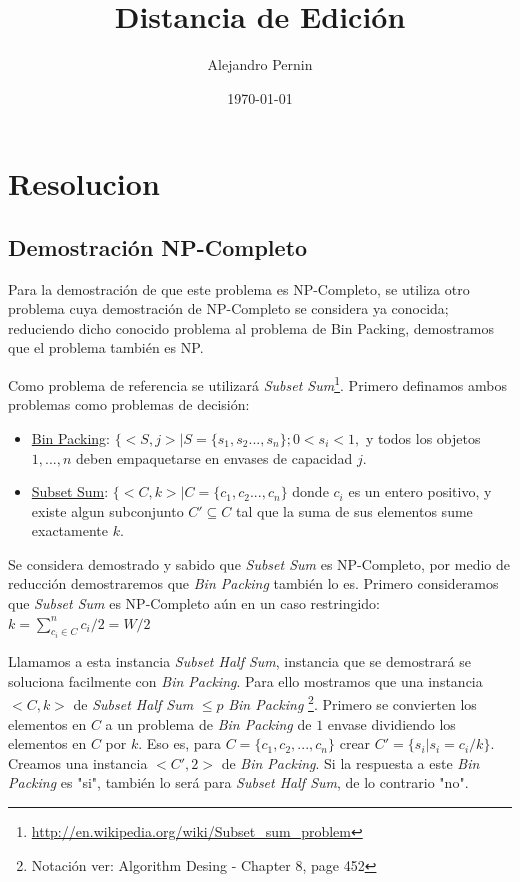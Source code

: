 \documentclass[12pt]{article}
\title{Distancia de Edición}
\author{
        Alejandro Pernin 
}
\date{\today}
\begin{document}


\maketitle

\newpage
\tableofcontents

\newpage



\newpage
\section{Resolucion}
	\subsection{Demostración NP-Completo}
		Para la demostración de que este problema es NP-Completo, se 
		utiliza otro problema cuya demostración de NP-Completo se considera
		ya conocida; reduciendo dicho conocido problema al problema de
		Bin Packing, demostramos que el problema también es NP.
		
		Como problema de referencia se utilizar\'a \emph{Subset Sum}\footnote{\url{http://en.wikipedia.org/wiki/Subset_sum_problem}}.
		Primero definamos ambos problemas como problemas de decisión:
		\begin{itemize}
			\item \underline{Bin Packing}: $\{ <S,j> | S = \{ s_{1},s_{2}...,s_{n}\}; 0<s_{i}<1,$ 
			y todos los objetos $1,...,n$ deben empaquetarse en envases de capacidad $j$.
			
			\item \underline{Subset Sum}: $\{ <C,k> | C = \{ c_{1},c_{2}...,c_{n}\}$ donde $c_{i}$
			es un entero positivo, y existe algun subconjunto $C'\subseteq C$ tal que la suma de sus
			elementos sume exactamente $k$.
		\end{itemize}
		
		Se considera demostrado y sabido que \emph{Subset Sum} es NP-Completo, 
		por medio de reducción demostraremos que \emph{Bin Packing} también lo es.
		Primero consideramos que \emph{Subset Sum} es NP-Completo aún en un caso restringido:
			\\ 
			
			$k=\sum_{c_{i}\in C}^{n} c_{i}/2 = W/2$
			
		Llamamos a esta instancia \emph{Subset Half Sum}, instancia que
		se demostrará se soluciona facilmente con \emph{Bin Packing}. Para
		ello mostramos que una instancia $<C,k>$ de \emph{Subset Half Sum}
		$\leq p$ \emph{Bin Packing} \footnote{Notación ver: Algorithm Desing - Chapter 8, page 452}.
		Primero se convierten los elementos en $C$ a un problema de \emph{Bin Packing}
		de $1$ envase dividiendo los elementos en $C$ por $k$. Eso es, para $C=\{c_{1},c_{2},...,c_{n}\}$
		crear $C'=\{ s_{i} |  s_{i}=c_{i}/k\}$. Creamos una instancia
		$<C',2>$ de \emph{Bin Packing}. Si la respuesta a este \emph{Bin Packing}
		es "si", también lo será para \emph{Subset Half Sum}, de lo contrario "no".
		\\
	
\end{document}
